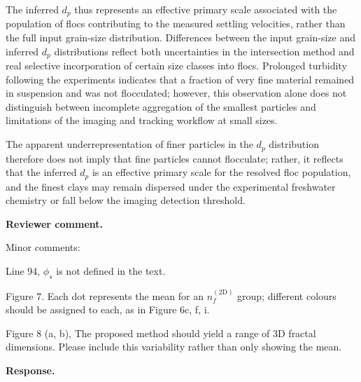 \documentclass[11pt]{article}
\newenvironment{Snippet}{%
  \par\vspace{0.3em}\begin{list}{}{\setlength{\leftmargin}{1em}\setlength{\rightmargin}{0.5em}}\item\small\itshape
}{%
  \end{list}\vspace{0.3em}
}
\begin{document}
\begin{enumerate}[label=\textbf{R3.\arabic*.}]
\begin{Snippet}
The inferred $d_p$ thus represents an effective primary scale associated with the population of flocs contributing to the measured settling velocities, rather than the full input grain-size distribution. Differences between the input grain-size and inferred $d_p$ distributions reflect both uncertainties in the intersection method and real selective incorporation of certain size classes into flocs. Prolonged turbidity following the experiments indicates that a fraction of very fine material remained in suspension and was not flocculated; however, this observation alone does not distinguish between incomplete aggregation of the smallest particles and limitations of the imaging and tracking workflow at small sizes.
\end{Snippet}
The apparent underrepresentation of finer particles in the $d_p$ distribution therefore does not imply that fine particles cannot flocculate; rather, it reflects that the inferred $d_p$ is an effective primary scale for the resolved floc population, and the finest clays may remain dispersed under the experimental freshwater chemistry or fall below the imaging detection threshold.

\item \textbf{Reviewer comment.}
\begin{Snippet}
Minor comments:

Line 94, $\phi_s$ is not defined in the text.

Figure 7. Each dot represents the mean for an $n_f^{(\mathrm{2D})}$ group; different colours should be assigned to each, as in Figure 6c, f, i.

Figure 8 (a, b), The proposed method should yield a range of 3D fractal dimensions. Please include this variability rather than only showing the mean.
\end{Snippet}
\textbf{Response.}


\end{enumerate}
\end{document}
